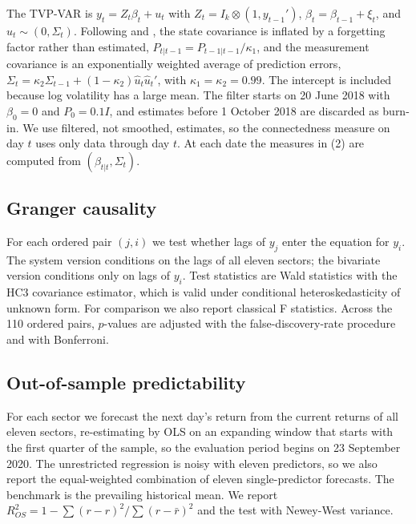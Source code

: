 \documentclass[11pt]{article}
\begin{document}
The TVP-VAR is $y_t = Z_t\beta_t + u_t$ with $Z_t = I_k\otimes(1, y_{t-1}')$, $\beta_t = \beta_{t-1}+\xi_t$, and $u_t\sim(0,\Sigma_t)$. Following \citet{koop2013} and \citet{antonakakis2020}, the state covariance is inflated by a forgetting factor rather than estimated, $P_{t|t-1} = P_{t-1|t-1}/\kappa_1$, and the measurement covariance is an exponentially weighted average of prediction errors, $\Sigma_t = \kappa_2\Sigma_{t-1}+(1-\kappa_2)\hat u_t\hat u_t'$, with $\kappa_1=\kappa_2=0.99$. The intercept is included because log volatility has a large mean. The filter starts on 20 June 2018 with $\beta_0=0$ and $P_0 = 0.1I$, and estimates before 1 October 2018 are discarded as burn-in. We use filtered, not smoothed, estimates, so the connectedness measure on day $t$ uses only data through day $t$. At each date the measures in (2) are computed from $(\beta_{t|t},\Sigma_t)$.

\subsection{Granger causality}

For each ordered pair $(j, i)$ we test whether lags of $y_j$ enter the equation for $y_i$. The system version conditions on the lags of all eleven sectors; the bivariate version conditions only on lags of $y_i$. Test statistics are Wald statistics with the HC3 covariance estimator, which is valid under conditional heteroskedasticity of unknown form. For comparison we also report classical F statistics. Across the 110 ordered pairs, $p$-values are adjusted with the \citet{benjamini1995} false-discovery-rate procedure and with Bonferroni.

\subsection{Out-of-sample predictability}

For each sector we forecast the next day's return from the current returns of all eleven sectors, re-estimating by OLS on an expanding window that starts with the first quarter of the sample, so the evaluation period begins on 23 September 2020. The unrestricted regression is noisy with eleven predictors, so we also report the equal-weighted combination of eleven single-predictor forecasts. The benchmark is the prevailing historical mean. We report $R^2_{OS} = 1 - \sum(r - \hat r)^2/\sum(r-\bar r)^2$ \citep{campbell2008} and the \citet{clark2007} test with Newey-West variance.
\end{document}
